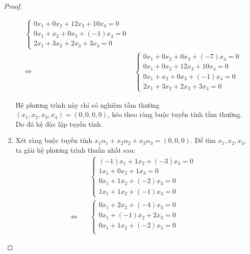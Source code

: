 \documentclass[class=linearalgebra,crop=false]{standalone}
\begin{document}
\begin{proof}
\begin{enumerate}[label = (\alph*)]
\begin{align*}
\begin{cases}
                      0x_{1} + 0x_{2} + 12x_{3} + 10x_{4} = 0 \\
                      0x_{1} + x_{2} + 0x_{3} + (-1)x_{4} = 0 \\
                      2x_{1} + 3x_{2} + 2x_{3} + 3x_{4} = 0
                  \end{cases}                            \\
                  \Leftrightarrow\quad &
                  \begin{cases}
                      0x_{1} + 0x_{2} + 0x_{3} + (-7)x_{4} = 0 \\
                      0x_{1} + 0x_{2} + 12x_{3} + 10x_{4} = 0  \\
                      0x_{1} + x_{2} + 0x_{3} + (-1)x_{4} = 0  \\
                      2x_{1} + 3x_{2} + 2x_{3} + 3x_{4} = 0
                  \end{cases}
              \end{align*}
              \par Hệ phương trình này chỉ có nghiệm tầm thường $(x_{1}, x_{2}, x_{3}, x_{4}) = (0, 0, 0, 0)$, kéo theo ràng buộc tuyến tính tầm thường. Do đó hệ độc lập tuyến tính.
        \item Xét ràng buộc tuyến tính $x_{1}\alpha_{1} + x_{2}\alpha_{2} + x_{3}\alpha_{3} = (0, 0, 0)$. Để tìm $x_{1}, x_{2}, x_{3}$, ta giải hệ phương trình thuần nhất sau:
              \begin{align*}
                                       & \begin{cases}
                                             (-1)x_{1} + 1x_{2} + (-3)x_{3} = 0 \\
                                             1x_{1} + 0x_{2} + 1x_{3} = 0       \\
                                             0x_{1} + 1x_{2} + (-2)x_{3} = 0    \\
                                             1x_{1} + 1x_{2} + (-1)x_{3} = 0
                                         \end{cases} \\
                  \Leftrightarrow\quad &
                  \begin{cases}
                      0x_{1} + 2x_{2} + (-4)x_{3} = 0 \\
                      0x_{1} + (-1)x_{2} + 2x_{3} = 0 \\
                      0x_{1} + 1x_{2} + (-2)x_{3} = 0 \\

\end{cases}
\end{align*}
\end{enumerate}
\end{proof}
\end{document}
